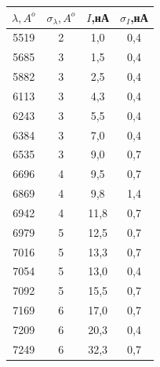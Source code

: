\documentclass[a4paper,12pt]{report}
\begin{document}
\begin{table}[H]
\begin{center}
\begin{tabular}{|c|c|c|c|}
\hline
$\lambda, A^{o}$ & $\sigma_{\lambda}, A^{o}$ & $I$,нА & $\sigma_{I}$,нА \\ \hline
5519      & 2               & 1,0                         & 0,4                              \\ \hline
5685      & 3               & 1,5                         & 0,4                              \\ \hline
5882      & 3               & 2,5                         & 0,4                              \\ \hline
6113      & 3               & 4,3                         & 0,4                              \\ \hline
6243      & 3               & 5,5                         & 0,4                              \\ \hline
6384      & 3               & 7,0                         & 0,4                              \\ \hline
6535      & 3               & 9,0                         & 0,7                              \\ \hline
6696      & 4               & 9,5                         & 0,7                              \\ \hline
6869      & 4               & 9,8                         & 1,4                              \\ \hline
6942      & 4               & 11,8                        & 0,7                              \\ \hline
6979      & 5               & 12,5                        & 0,7                              \\ \hline
7016      & 5               & 13,3                        & 0,7                              \\ \hline
7054      & 5               & 13,0                        & 0,4                              \\ \hline
7092      & 5               & 15,5                        & 0,7                              \\ \hline
7169      & 6               & 17,0                        & 0,7                              \\ \hline
7209      & 6               & 20,3                        & 0,4                              \\ \hline
7249      & 6               & 32,3                        & 0,7                              \\ \hline

\end{tabular}
\end{center}
\end{table}
\end{document}
